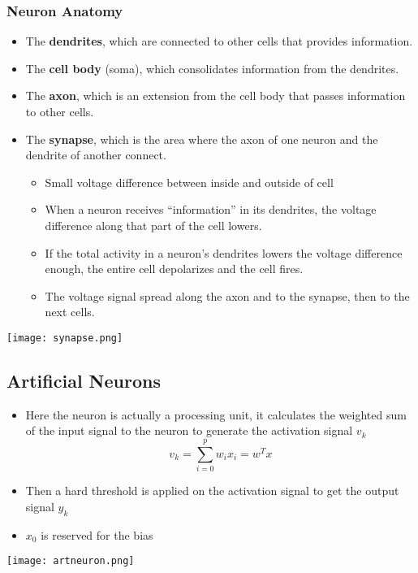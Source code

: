 \documentclass[11pt]{article}
\begin{document}
\subsubsection{Neuron Anatomy}
\begin{itemize}
\item The \textbf{dendrites}, which are connected to other cells that provides information.
\item The \textbf{cell body} (soma), which consolidates information from the dendrites.
\item The \textbf{axon}, which is an extension from the cell body that passes information to other cells.
\item The \textbf{synapse}, which is the area where the axon of one neuron and the dendrite of another connect.
\begin{itemize}
\item Small voltage difference between inside and outside of cell
\item When a neuron receives “information” in its dendrites, the voltage difference along that part of the cell lowers.
\item If the total activity in a neuron’s dendrites lowers the voltage difference enough, the entire cell depolarizes and the cell fires.
\item The voltage signal spread along the axon and to the synapse, then to the next cells.
\end{itemize}
\end{itemize}
\begin{center}
\texttt{[image: synapse.png]}
\end{center}



\subsection{Artificial Neurons}
\begin{itemize}
\item Here the neuron is actually a processing unit, it calculates the weighted sum of the input signal to the neuron to generate the activation signal $v_k$
$$ v_k = \sum_{i=0}^p w_i x_i = w^Tx$$
\item Then a hard threshold is applied on the activation signal to get the output signal $y_k$
\item $x_0$ is reserved for the bias
\end{itemize}
\begin{center}
\texttt{[image: artneuron.png]}
\end{center}
\end{document}
